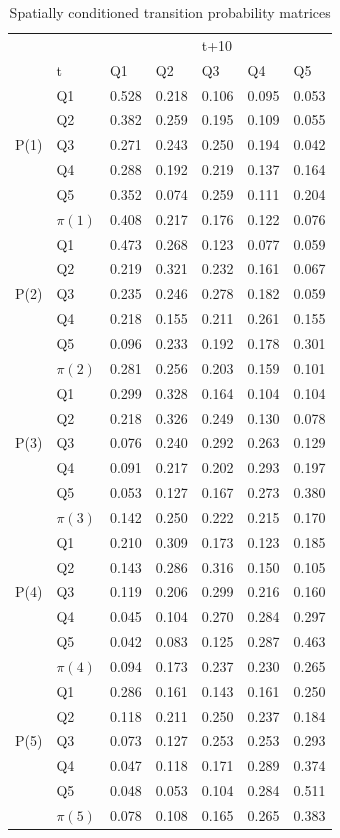 \documentclass[11pt, titlepage]{amsart}
\begin{document}
\begin{table}
  \centering
  \small
\begin{tabular}{|ll|lllll|}\hline
    & & & & t+10& & \\
    & t& Q1& Q2& Q3& Q4& Q5\\
    \hline
    & Q1&  0.528& 0.218& 0.106& 0.095& 0.053\\
    & Q2&  0.382& 0.259& 0.195& 0.109& 0.055\\
P(1)& Q3&  0.271& 0.243& 0.250& 0.194& 0.042\\
    & Q4&  0.288& 0.192& 0.219& 0.137& 0.164\\
    & Q5&  0.352& 0.074& 0.259& 0.111& 0.204\\
    \hline
    & $\pi(1)$& 0.408& 0.217& 0.176& 0.122& 0.076\\
    \hline
    & Q1& 0.473& 0.268& 0.123& 0.077& 0.059\\
    & Q2& 0.219& 0.321& 0.232& 0.161& 0.067\\
P(2)& Q3& 0.235& 0.246& 0.278& 0.182& 0.059\\
    & Q4& 0.218& 0.155& 0.211& 0.261& 0.155\\
    & Q5& 0.096& 0.233& 0.192& 0.178& 0.301\\
    \hline
    & $\pi(2)$& 0.281& 0.256& 0.203& 0.159& 0.101\\
    \hline
    & Q1& 0.299& 0.328& 0.164& 0.104& 0.104\\
    & Q2& 0.218& 0.326& 0.249& 0.130& 0.078\\
P(3)& Q3& 0.076& 0.240& 0.292& 0.263& 0.129\\
    & Q4& 0.091& 0.217& 0.202& 0.293& 0.197\\
    & Q5& 0.053& 0.127& 0.167& 0.273& 0.380\\
    \hline
    & $\pi(3)$& 0.142& 0.250& 0.222& 0.215& 0.170\\
    \hline
    & Q1& 0.210& 0.309& 0.173& 0.123& 0.185\\
    & Q2& 0.143& 0.286& 0.316& 0.150& 0.105\\
P(4)& Q3& 0.119& 0.206& 0.299& 0.216& 0.160\\
    & Q4& 0.045& 0.104& 0.270& 0.284& 0.297\\
    & Q5& 0.042& 0.083& 0.125& 0.287& 0.463\\
    \hline
   & $\pi(4)$&  0.094& 0.173& 0.237& 0.230& 0.265\\
    \hline
    & Q1& 0.286& 0.161& 0.143& 0.161& 0.250\\
    & Q2& 0.118& 0.211& 0.250& 0.237& 0.184\\
P(5)& Q3& 0.073& 0.127& 0.253& 0.253& 0.293\\
    & Q4& 0.047& 0.118& 0.171& 0.289& 0.374\\
    & Q5& 0.048& 0.053& 0.104& 0.284& 0.511\\
    \hline
    & $\pi(5)$& 0.078& 0.108& 0.165& 0.265& 0.383\\
    \hline
\end{tabular}
\caption{Spatially conditioned transition probability matrices}
\label{t:sm}
\end{table}
\end{document}
